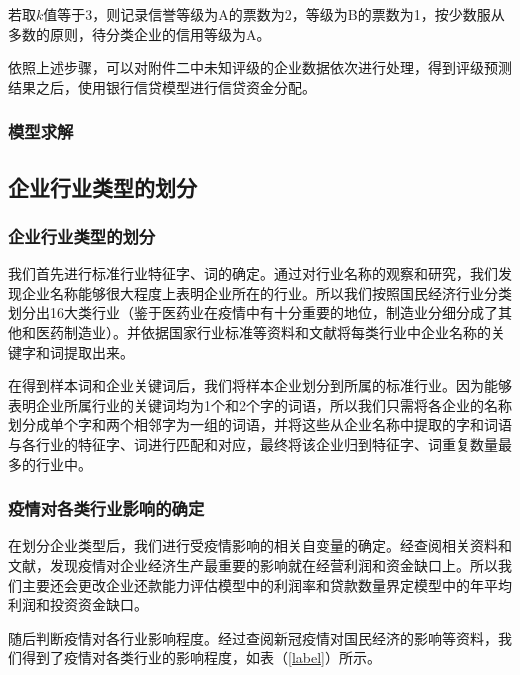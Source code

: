\documentclass{my_paper}
\begin{document}
\newpage
若取$k$值等于3，则记录信誉等级为A的票数为2，等级为B的票数为1，按少数服从多数的原则，待分类企业的信用等级为A。

依照上述步骤，可以对附件二中未知评级的企业数据依次进行处理，得到评级预测结果之后，使用银行信贷模型进行信贷资金分配。

\subsubsection{模型求解}

\subsection{企业行业类型的划分}
\subsubsection{企业行业类型的划分}
我们首先进行标准行业特征字、词的确定。通过对行业名称的观察和研究，我们发现企业名称能够很大程度上表明企业所在的行业。所以我们按照国民经济行业分类划分出16大类行业（鉴于医药业在疫情中有十分重要的地位，制造业分细分成了其他和医药制造业）。并依据国家行业标准\cite{7}等资料和文献将每类行业中企业名称的关键字和词提取出来。

在得到样本词和企业关键词后，我们将样本企业划分到所属的标准行业。因为能够表明企业所属行业的关键词均为1个和2个字的词语，所以我们只需将各企业的名称划分成单个字和两个相邻字为一组的词语，并将这些从企业名称中提取的字和词语与各行业的特征字、词进行匹配和对应，最终将该企业归到特征字、词重复数量最多的行业中。

\subsubsection{疫情对各类行业影响的确定}
    在划分企业类型后，我们进行受疫情影响的相关自变量的确定。经查阅相关资料和文献\cite{8,9}，发现疫情对企业经济生产最重要的影响就在经营利润和资金缺口上。所以我们主要还会更改企业还款能力评估模型中的利润率和贷款数量界定模型中的年平均利润和投资资金缺口。

随后判断疫情对各行业影响程度。经过查阅新冠疫情对国民经济的影响等资料，我们得到了疫情对各类行业的影响程度，如表（\ref{label}）所示。
\end{document}
